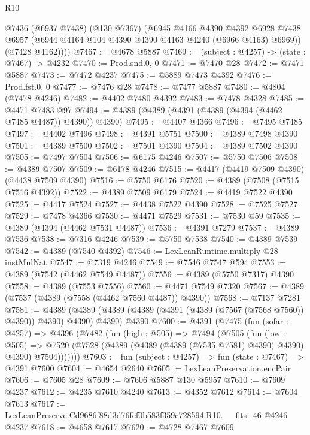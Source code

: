 \begin{lexlean}{R10}
\begin{coremodule}
        @7436
          (@6937 @7438)
          (@130 @7367)
          (@6945
            @4166
            @4390
            @4392
            @6928
            @7438
            @6957
            (@6944 @4164 @104 @4390 @4390 @4163 @4240 (@6966 @4163) @6969))
          (@7428 @4162))))
@7467 := @4678 @5887
@7469 := (subject : @4257) -> (state : @7467) -> @4232
@7470 := Prod.snd.{0, 0}
@7471 := @7470 @28
@7472 := @7471 @5887
@7473 := @7472 @4237
@7475 := @5889 @7473 @4392
@7476 := Prod.fst.{0, 0}
@7477 := @7476 @28
@7478 := @7477 @5887
@7480 := @4804 (@7478 @4246)
@7482 := @4402 @7480 @4392
@7483 := @7478 @4328
@7485 := @4471 @7483 @97
@7494 := @4389 (@4389 (@4391 (@4389 (@4394 (@4462 @7485 @4487)) @4390)) @4390)
@7495 := @4407 @4366
@7496 := @7495 @7485
@7497 := @4402 @7496
@7498 := @4391 @5751
@7500 := @4389 @7498 @4390
@7501 := @4389 @7500
@7502 := @7501 @4390
@7504 := @4389 @7502 @4390
@7505 := @7497 @7504
@7506 := @6175 @4246
@7507 := @5750 @7506
@7508 := @4389 @7507
@7509 := @6178 @4246
@7515 := @4417 (@4419 @7509 @4390) (@4438 @7509 @4390)
@7516 := @5750 @6176
@7520 := @4389 (@7508 (@7515 @7516 @4392))
@7522 := @4389 @7509 @6179
@7524 := @4419 @7522 @4390
@7525 := @4417 @7524
@7527 := @4438 @7522 @4390
@7528 := @7525 @7527
@7529 := @7478 @4366
@7530 := @4471 @7529
@7531 := @7530 @59
@7535 := @4389 (@4394 (@4462 @7531 @4487))
@7536 := @4391 @7279
@7537 := @4389 @7536
@7538 := @7316 @4246
@7539 := @5750 @7538
@7540 := @4389 @7539
@7542 := @4389 (@7540 @4392)
@7546 := LexLeanRuntime.multiply @28 instMulNat
@7547 := @7319 @4246
@7549 := @7546 @7547 @594
@7553 := @4389 (@7542 (@4462 @7549 @4487))
@7556 := @4389 (@5750 @7317) @4390
@7558 := @4389 (@7553 @7556)
@7560 := @4471 @7549 @7320
@7567 := @4389 (@7537 (@4389 (@7558 (@4462 @7560 @4487)) @4390))
@7568 := @7137 @7281
@7581 := @4389
    (@4389 (@4389 (@4389 (@4391 (@4389 (@7567 (@7568 @7560)) @4390)) @4390) @4390) @4390)
    @4390
@7600 := @4391
    (@7475
      (fun (sofar : @4257) =>
      @4396
        (@7482
          (fun (high : @505) =>
          @7494
            (@7505
              (fun (low : @505) =>
              @7520 (@7528 (@4389 (@4389 (@4389 (@7535 @7581) @4390) @4390) @4390) @7504)))))))
@7603 := fun (subject : @4257) => fun (state : @7467) => @4391 @7600
@7604 := @4654 @2640
@7605 := LexLeanPreservation.encPair
@7606 := @7605 @28
@7609 := @7606 @5887 @130 @5957
@7610 := @7609 @4237
@7612 := @4235 @7610 @4240
@7613 := @4352 @7612
@7614 := @7604 @7613
@7617 := LexLeanPreserve.Cd9686f88d3d76fcf0b583f359c728594.R10.__fits_46 @4246 @4237
@7618 := @4658 @7617
@7620 := @4728 @7467 @7609

\end{coremodule}
\end{lexlean}
